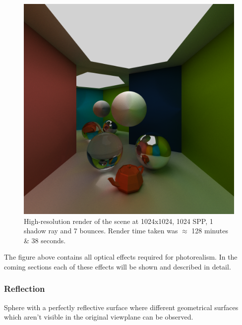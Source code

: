 \documentclass[a4paper, twocolumn]{article}
\begin{document}
            \begin{figure}[H]
                \centering
                \includegraphics[width=\linewidth]{share/new_render.png}
                \caption{High-resolution render of the scene at 1024x1024, 1024 SPP, 1 shadow ray and 7 bounces. Render time taken was \(\approx\) 128 minutes \& 38 seconds.}
                \label{fig:render}
            \end{figure}

            The figure above contains all optical effects required for photorealism. In the coming sections each of these effects will be shown and described in detail.

            \subsubsection*{Reflection}

            Sphere with a perfectly reflective surface where different geometrical surfaces which aren't visible in the original viewplane can be observed. 
\end{document}
